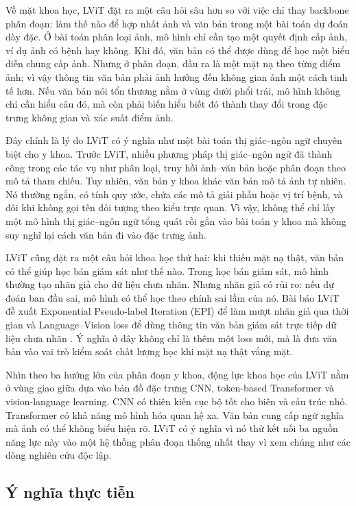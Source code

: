 Về mặt khoa học, LViT đặt ra một câu hỏi sâu hơn so với việc chỉ thay backbone phân đoạn: làm thế nào để hợp nhất ảnh và văn bản trong một bài toán dự đoán dày đặc. Ở bài toán phân loại ảnh, mô hình chỉ cần tạo một quyết định cấp ảnh, ví dụ ảnh có bệnh hay không. Khi đó, văn bản có thể được dùng để học một biểu diễn chung cấp ảnh. Nhưng ở phân đoạn, đầu ra là một mặt nạ theo từng điểm ảnh; vì vậy thông tin văn bản phải ảnh hưởng đến không gian ảnh một cách tinh tế hơn. Nếu văn bản nói tổn thương nằm ở vùng dưới phổi trái, mô hình không chỉ cần hiểu câu đó, mà còn phải biến hiểu biết đó thành thay đổi trong đặc trưng không gian và xác suất điểm ảnh.

Đây chính là lý do LViT có ý nghĩa như một bài toán thị giác--ngôn ngữ chuyên biệt cho y khoa. Trước LViT, nhiều phương pháp thị giác--ngôn ngữ đã thành công trong các tác vụ như phân loại, truy hồi ảnh--văn bản hoặc phân đoạn theo mô tả tham chiếu. Tuy nhiên, văn bản y khoa khác văn bản mô tả ảnh tự nhiên. Nó thường ngắn, có tính quy ước, chứa các mô tả giải phẫu hoặc vị trí bệnh, và đôi khi không gọi tên đối tượng theo kiểu trực quan. Vì vậy, không thể chỉ lấy một mô hình thị giác--ngôn ngữ tổng quát rồi gắn vào bài toán y khoa mà không suy nghĩ lại cách văn bản đi vào đặc trưng ảnh.

LViT cũng đặt ra một câu hỏi khoa học thứ hai: khi thiếu mặt nạ thật, văn bản có thể giúp học bán giám sát như thế nào. Trong học bán giám sát, mô hình thường tạo nhãn giả cho dữ liệu chưa nhãn. Nhưng nhãn giả có rủi ro: nếu dự đoán ban đầu sai, mô hình có thể học theo chính sai lầm của nó. Bài báo LViT đề xuất Exponential Pseudo-label Iteration (EPI) để làm mượt nhãn giả qua thời gian và Language--Vision loss để dùng thông tin văn bản giám sát trực tiếp dữ liệu chưa nhãn \cite{li2023lvit}. Ý nghĩa ở đây không chỉ là thêm một loss mới, mà là đưa văn bản vào vai trò kiểm soát chất lượng học khi mặt nạ thật vắng mặt.

Nhìn theo ba hướng lớn của phân đoạn y khoa, động lực khoa học của LViT nằm ở vùng giao giữa dựa vào bản đồ đặc trưng CNN, token-based Transformer và vision-language learning. CNN có thiên kiến cục bộ tốt cho biên và cấu trúc nhỏ. Transformer có khả năng mô hình hóa quan hệ xa. Văn bản cung cấp ngữ nghĩa mà ảnh có thể không biểu hiện rõ. LViT có ý nghĩa vì nó thử kết nối ba nguồn năng lực này vào một hệ thống phân đoạn thống nhất thay vì xem chúng như các dòng nghiên cứu độc lập.

\subsection{Ý nghĩa thực tiễn}


